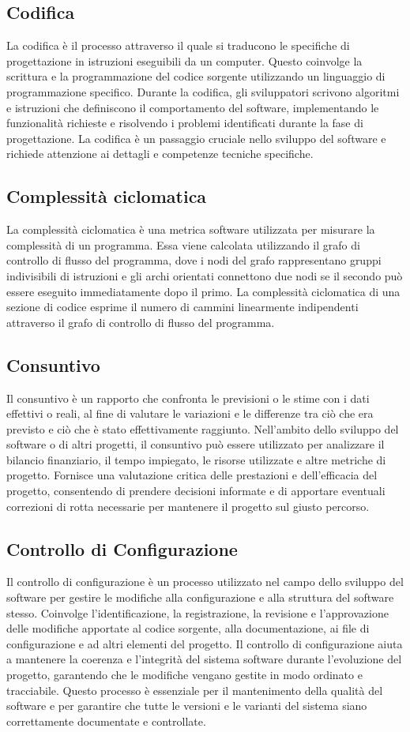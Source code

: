 \subsection*{Codifica} 
La codifica è il processo attraverso il quale si traducono le specifiche di progettazione in istruzioni eseguibili da un computer. Questo coinvolge la scrittura e la programmazione del codice sorgente utilizzando un linguaggio di programmazione specifico. Durante la codifica, gli sviluppatori scrivono algoritmi e istruzioni che definiscono il comportamento del software, implementando le funzionalità richieste e risolvendo i problemi identificati durante la fase di progettazione. La codifica è un passaggio cruciale nello sviluppo del software e richiede attenzione ai dettagli e competenze tecniche specifiche.
\subsection*{Complessità ciclomatica} 
La complessità ciclomatica è una metrica software utilizzata per misurare la complessità di un programma. Essa viene calcolata utilizzando il grafo di controllo di flusso del programma, dove i nodi del grafo rappresentano gruppi indivisibili di istruzioni e gli archi orientati connettono due nodi se il secondo può essere eseguito immediatamente dopo il primo. La complessità ciclomatica di una sezione di codice esprime il numero di cammini linearmente indipendenti attraverso il grafo di controllo di flusso del programma.
\subsection*{Consuntivo} 
Il consuntivo è un rapporto che confronta le previsioni o le stime con i dati effettivi o reali, al fine di valutare le variazioni e le differenze tra ciò che era previsto e ciò che è stato effettivamente raggiunto. Nell'ambito dello sviluppo del software o di altri progetti, il consuntivo può essere utilizzato per analizzare il bilancio finanziario, il tempo impiegato, le risorse utilizzate e altre metriche di progetto. Fornisce una valutazione critica delle prestazioni e dell'efficacia del progetto, consentendo di prendere decisioni informate e di apportare eventuali correzioni di rotta necessarie per mantenere il progetto sul giusto percorso.
\subsection*{Controllo di Configurazione} 
Il controllo di configurazione è un processo utilizzato nel campo dello sviluppo del software per gestire le modifiche alla configurazione e alla struttura del software stesso. Coinvolge l'identificazione, la registrazione, la revisione e l'approvazione delle modifiche apportate al codice sorgente, alla documentazione, ai file di configurazione e ad altri elementi del progetto. Il controllo di configurazione aiuta a mantenere la coerenza e l'integrità del sistema software durante l'evoluzione del progetto, garantendo che le modifiche vengano gestite in modo ordinato e tracciabile. Questo processo è essenziale per il mantenimento della qualità del software e per garantire che tutte le versioni e le varianti del sistema siano correttamente documentate e controllate.
